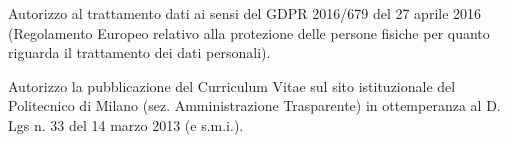 \documentclass[11pt, a4paper]{awesome-cv}
\begin{document}
{\hypersetup{urlcolor=darktext}\makecvheader[C]}\hypersetup{urlcolor=myblue}


% 


\newpage

\newpage

\newpage





% 
% 
% 


\newpage



Autorizzo al trattamento dati ai sensi del GDPR 2016/679 del 27 aprile 2016 (Regolamento Europeo relativo alla protezione delle persone fisiche per quanto riguarda il trattamento dei dati personali).

Autorizzo la pubblicazione del Curriculum Vitae sul sito istituzionale del Politecnico di Milano (sez. Amministrazione Trasparente) in ottemperanza al D. Lgs n. 33 del 14 marzo 2013 (e s.m.i.).




\end{document}

